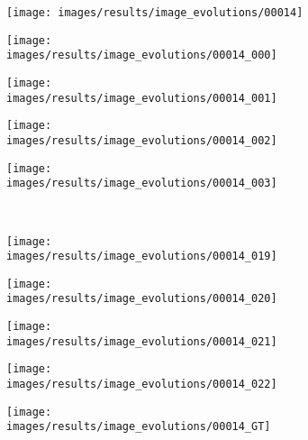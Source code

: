 \begin{figure}[t]
 \begin{subfigure}[c]{0.19\textwidth}
  \centering
  \texttt{[image: images/results/image\_evolutions/00014]}
 \end{subfigure}
 \begin{subfigure}[c]{0.19\textwidth}
  \centering
  \texttt{[image: images/results/image\_evolutions/00014\_000]}
 \end{subfigure}
 \begin{subfigure}[c]{0.19\textwidth}
  \centering
  \texttt{[image: images/results/image\_evolutions/00014\_001]}
 \end{subfigure}
 \begin{subfigure}[c]{0.19\textwidth}
  \centering
  \texttt{[image: images/results/image\_evolutions/00014\_002]}
 \end{subfigure}
 \begin{subfigure}[c]{0.19\textwidth}
  \centering
  \texttt{[image: images/results/image\_evolutions/00014\_003]}
 \end{subfigure}
 \\
 \begin{subfigure}[c]{0.19\textwidth}
  \centering
  \texttt{[image: images/results/image\_evolutions/00014\_019]}
 \end{subfigure}
 \begin{subfigure}[c]{0.19\textwidth}
  \centering
  \texttt{[image: images/results/image\_evolutions/00014\_020]}
 \end{subfigure}
 \begin{subfigure}[c]{0.19\textwidth}
  \centering
  \texttt{[image: images/results/image\_evolutions/00014\_021]}
 \end{subfigure}
 \begin{subfigure}[c]{0.19\textwidth}
  \centering
  \texttt{[image: images/results/image\_evolutions/00014\_022]}
 \end{subfigure}
 \begin{subfigure}[c]{0.19\textwidth}
  \centering
  \texttt{[image: images/results/image\_evolutions/00014\_GT]}
 \end{subfigure}
 \\
 

\end{figure}
